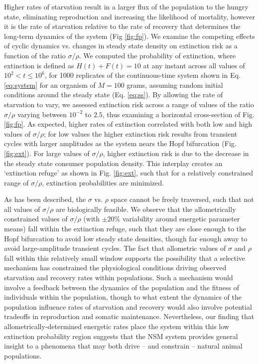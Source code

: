 \documentclass{pnastwo}
\begin{document}
\begin{article}
Higher rates of starvation result in a larger flux of the population to the hungry state, eliminating reproduction and increasing the likelihood of mortality, however it is the rate of starvation relative to the rate of recovery that determines the long-term dynamics of the system (Fig \ref{fig:fp}).
We examine the competing effects of cyclic dynamics vs. changes in steady state density on extinction risk as a function of the ratio $\sigma/\rho$.
We computed the probability of extinction, where extinction is defined as $H(t)+F(t)=10$ at any instant across all values of $10^2<t\leq 10^6$, for 1000 replicates of the continuous-time system shown in Eq. \ref{eq:system} for an organism of $M=100$ grams, assuming random initial conditions around the steady state (Eq. \ref{eq:ss}). %
By allowing the rate of starvation to vary, we assessed extinction risk across a range of values of the ratio $\sigma/\rho$ varying between $10^{-2}$ to $2.5$, thus examining a horizontal cross-section of Fig. \ref{fig:fp}.
As expected, higher rates of extinction correlated with both low and high values of $\sigma/\rho$; for low values the higher extinction risk results from transient cycles with larger amplitudes as the system nears the Hopf bifurcation (Fig. \ref{fig:ext}).
For large values of $\sigma/\rho$, higher extinction risk is due to the decrease in the steady state consumer population density.
This interplay creates an `extinction refuge' as shown in Fig. \ref{fig:ext}, such that for a relatively constrained range of $\sigma/\rho$, extinction probabilities are minimized.

As has been described, the $\sigma$ vs. $\rho$ space cannot be freely traversed, such that not all values of $\sigma/\rho$ are biologically feasible.
We observe that the allometrically constrained values of $\sigma/\rho$ (with $\pm 20\%$ variability around energetic parameter means) fall within the extinction refuge, such that they are close enough to the Hopf bifurcation to avoid low steady state densities, though far enough away to avoid large-amplitude transient cycles.
The fact that allometric values of $\sigma$ and $\rho$ fall within this relatively small window supports the possibility that a selective mechanism has constrained the physiological conditions driving observed starvation and recovery rates within populations.
Such a mechanism would involve a feedback between the dynamics of the population and the fitness of individuals within the population, though to what extent the dynamics of the population influence rates of starvation and recovery would also involve potential tradeoffs in reproduction and somatic maintenance.
Nevertheless, our finding that allometrically-determined energetic rates place the system within this low extinction probability region suggests that the NSM system provides general insight to a phenomena that may both drive -- and constrain -- natural animal populations.




\end{article}
\end{document}
